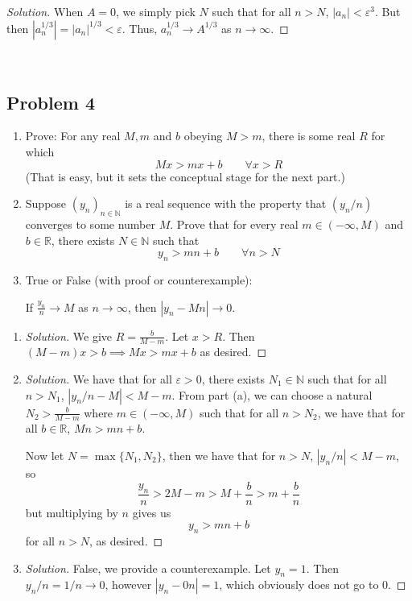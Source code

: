 \documentclass{article}
\newcommand{\N}{{\mathbb N}}
\newcommand{\R}{{\mathbb R}}
\newcommand{\ep}{{\varepsilon}}
\begin{document}
\begin{proof}[Solution]
	When $A = 0$, we simply pick $N$ such that for all $n>N$, $|a_n|<\ep^3$.
	But then $|a_n^{1/3}| = |a_n|^{1/3} < \ep$.
	Thus, $a_n^{1/3} \to A^{1/3}$ as $n \to \infty$.
\end{proof}
\clearpage
~\clearpage

\subsection*{Problem 4}
{\it \begin{enumerate}
	\item Prove: For any real $M,m$ and $b$ obeying $M > m$,
		there is some real $R$ for which
		\[
			Mx > mx + b \qquad \forall x>R
		\]
		(That is easy, but it sets the conceptual stage for the next part.)
	\item Suppose $(y_n)_{n\in\N}$ is a real sequence with the property that
		$(y_n/n)$ converges to some number $M$.
		Prove that for every real $m \in (-\infty, M)$ and $b \in \R$,
		there exists $N \in \N$ such that
		\[
			y_n > mn + b \qquad \forall n>N
		\]
	\item True or False (with proof or counterexample):
		\begin{center}
			If $\frac{y_n}{n} \to M$ as $n \to \infty$,
			then $|y_n - Mn| \to 0$.
		\end{center}
\end{enumerate}}

\begin{enumerate}
	\item \begin{proof}[Solution]\let\qed\relax
		We give $R = \frac{b}{M - m}$.
		Let $x > R$.
		Then $(M-m)x > b \implies Mx > mx + b$ as desired.
	\end{proof}
	\item \begin{proof}[Solution]\let\qed\relax
		We have that for all $\ep > 0$,
		there exists $N_1 \in \N$ such that for all $n > N_1$,
		$|y_n/n - M| < M - m$.
		From part (a), we can choose a natural $N_2 > \frac{b}{M-m}$
		where $m \in (-\infty,M)$ such that for all $n > N_2$,
		we have that for all $b \in \R$, $Mn > mn + b$.

		Now let $N = \max\{N_1,N_2\}$,
		then we have that for $n > N$,
		$|y_n/n| < M - m$, so
		\[
			\frac{y_n}{n} > 2M - m > M + \frac{b}{n} > m + \frac{b}{n}
		\]
		but multiplying by $n$ gives us
		\[
			y_n > mn + b
		\]
		for all $n > N$, as desired.
	\end{proof}
	\item \begin{proof}[Solution]\let\qed\relax
		False, we provide a counterexample.
		Let $y_n = 1$.
		Then $y_n/n = 1/n \to 0$, however $|y_n - 0n| = 1$,
		which obviously does not go to $0$.
	\end{proof} 
\end{enumerate}
\clearpage
~\clearpage
\end{document}

